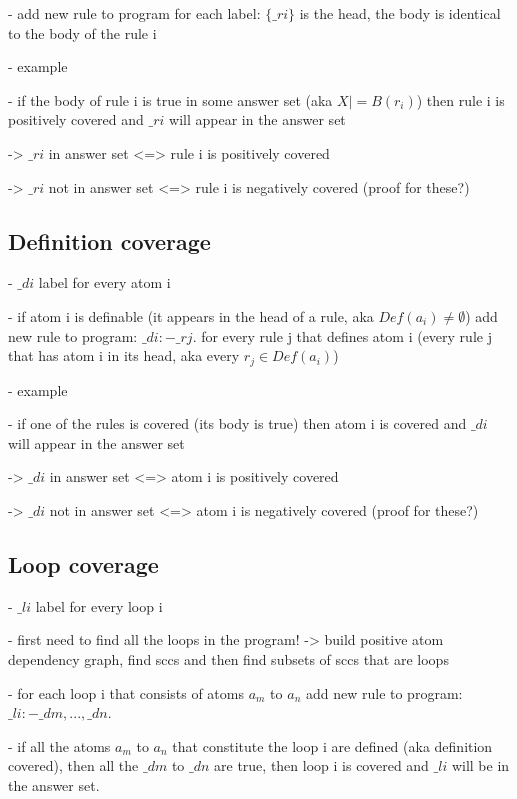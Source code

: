 - add new rule to program for each label: $\{\_ri\}$ is the head, the body is identical to the body of the rule i

- example

- if the body of rule i is true in some answer set (aka $X |= B(r_i)$) then rule i is positively covered and $\_ri$ will appear in the answer set 

-> $\_ri$ in answer set <=> rule i is positively covered

-> $\_ri$ not in answer set <=> rule i is negatively covered (proof for these?)

\subsection{Definition coverage}
\label{subsec:Computing coverage metrics for propositional programs/General approach/Definition coverage}
- $\_di$ label for every atom i

- if atom i is definable (it appears in the head of a rule, aka $Def(a_i)\neq\emptyset$) add new rule to program: $\_di :- \_rj$. for every rule j that defines atom i 
(every rule j that has atom i in its head, aka every $r_j \in Def(a_i)$)

- example

- if one of the rules is covered (its body is true) then atom i is covered and $\_di$ will appear in the answer set

-> $\_di$ in answer set <=> atom i is positively covered

-> $\_di$ not in answer set <=> atom i is negatively covered (proof for these?)

\subsection{Loop coverage}
\label{subsec:Computing coverage metrics for propositional programs/General approach/Loop coverage}
- $\_li$ label for every loop i

- first need to find all the loops in the program! -> build positive atom dependency graph, find sccs and then find subsets of sccs 
that are loops

- for each loop i that consists of atoms $a_m$ to $a_n$ add new rule to program: $\_li :- \_dm, ..., \_dn$.

- if all the atoms $a_m$ to $a_n$ that constitute the loop i are defined (aka definition covered), then all the $\_dm$ to $\_dn$ are true, 
then loop i is covered and $\_li$ will be in the answer set.


